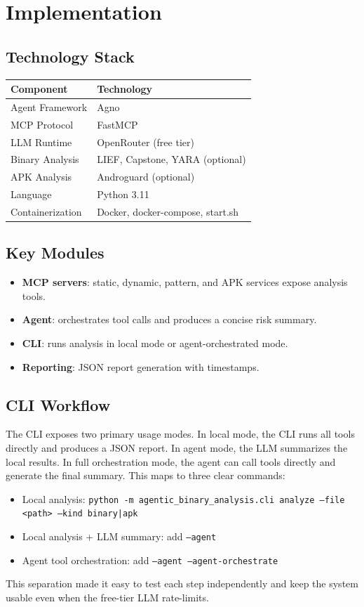 \documentclass[11pt]{article}
\begin{document}
\section{Implementation}
\subsection{Technology Stack}
\begin{tabular}{@{}ll@{}}
\toprule
Component & Technology \\ \midrule
Agent Framework & Agno \\ 
MCP Protocol & FastMCP \\ 
LLM Runtime & OpenRouter (free tier) \\ 
Binary Analysis & LIEF, Capstone, YARA (optional) \\ 
APK Analysis & Androguard (optional) \\ 
Language & Python 3.11 \\ 
Containerization & Docker, docker-compose, start.sh \\ \bottomrule
\end{tabular}

\subsection{Key Modules}
\begin{itemize}[leftmargin=*]
  \item \textbf{MCP servers}: static, dynamic, pattern, and APK services expose analysis tools.
  \item \textbf{Agent}: orchestrates tool calls and produces a concise risk summary.
  \item \textbf{CLI}: runs analysis in local mode or agent-orchestrated mode.
  \item \textbf{Reporting}: JSON report generation with timestamps.
\end{itemize}

\subsection{CLI Workflow}
The CLI exposes two primary usage modes. In local mode, the CLI runs all tools directly and produces a JSON report. In agent mode, the LLM summarizes the local results. In full orchestration mode, the agent can call tools directly and generate the final summary. This maps to three clear commands:
\begin{itemize}[leftmargin=*]
  \item Local analysis: \texttt{python -m agentic\_binary\_analysis.cli analyze --file <path> --kind binary|apk}
  \item Local analysis + LLM summary: add \texttt{--agent}
  \item Agent tool orchestration: add \texttt{--agent --agent-orchestrate}
\end{itemize}
This separation made it easy to test each step independently and keep the system usable even when the free-tier LLM rate-limits.
\end{document}
